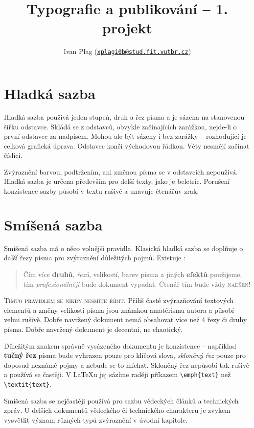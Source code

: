 \documentclass[a4paper, 10pt, twocolumn]{article}
\title{Typografie a publikování -- 1. projekt \\\medskip}
\author{Ivan Plag (\texttt{\href{mailto:xplagi0b@stud.fit.vutbr.cz}{xplagi0b@stud.fit.vutbr.cz}})}
\date{}
\begin{document}
\maketitle
\section{Hladká sazba}
Hladká sazba používá jeden stupeň, druh a řez písma a je sázena na stanovenou šířku odstavce. Skládá se z odstavců, obvykle začínajících zarážkou, nejde-li o první odstavec za nadpisem. Mohou ale být sázeny i bez zarážky -- rozhodující je celková grafická úprava. Odstavec končí východovou řádkou. Věty nesmějí začínat číslicí.

Zvýraznění barvou, podtržením, ani změnou písma se v odstavcích nepoužívá. Hladká sazba je určena především pro delší texty, jako je beletrie. Porušení konzistence sazby působí v textu rušivě a unavuje čtenářův zrak.

\section{Smíšená sazba}
\label{sec:2}
Smíšená sazba má o něco volnější pravidla. Klasická hladká sazba se doplňuje o další řezy písma pro zvýraznění důležitých pojmů. Existuje :

\begin{quote}
Čím více \textbf{druhů}, \emph{řezů}, {\footnotesize velikostí}, barev písma \textsf{a jiných {\tiny \bfseries efektů}} použijeme, tím \emph{profesionálněji} bude dokument vypadat. Čtenář tím {\large bude \LARGE vždy \Huge \textsc{nadšen!}}
\end{quote}

\textsc{Tímto pravidlem se nikdy nesmíte řídit.} Příliš časté zvýrazňování textových elementů a změny velikosti písma jsou známkou amatérismu autora a působí velmi rušivě. Dobře navržený dokument nemá obsahovat více než
4 řezy či druhy písma. Dobře navržený dokument je decentní, ne chaotický.

Důležitým znakem správně vysázeného dokumentu je konzistence -- například \textbf{tučný řez} písma bude vyhrazen pouze pro klíčová slova, \emph{skloněný řez} pouze pro doposud neznámé pojmy a nebude se to míchat. Skloněný řez nepůsobí tak rušivě a používá se častěji. V \LaTeX u jej sázíme raději příkazem \verb|\emph{text}| než \verb|\textit{text}|.

Smíšená sazba se nejčastěji používá pro sazbu vědeckých článků a technických zpráv. U delších dokumentů vědeckého či technického charakteru je zvykem vysvětlit význam různých typů zvýraznění v úvodní kapitole.
\end{document}
